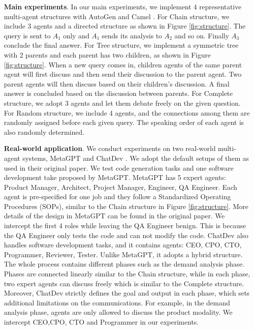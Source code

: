 \textbf{Main experiments}. In our main experiments, we implement 4 representative multi-agent structures with AutoGen \citep{wu2023autogen} and Camel \citep{li2023camel}. For Chain structure, we include 3 agents and a directed structure as shown in Figure \ref{fig:structure}. The query is sent to $A_1$ only and $A_1$ sends its analysis to $A_2$ and so on. Finally $A_3$ conclude the final answer. For Tree structure, we implement a symmetric tree with 2 parents and each parent has two children, as shown in Figure \ref{fig:structure}. When a new query comes in, children agents of the same parent agent will first discuss and then send their discussion to the parent agent. Two parent agents will then discuss based on their children's discussion. A final answer is concluded based on the discussion between parents. For Complete structure, we adopt 3 agents and let them debate freely on the given question. For Random structure, we include 4 agents, and the connections among them are randomly assigned before each given query. The speaking order of each agent is also randomly determined. 

\textbf{Real-world application}. We conduct experiments on two real-world multi-agent systems, MetaGPT \citep{hong2023metagpt} and ChatDev \citep{qian2024chatdev}. We adopt the default setups of them as used in their original paper. We test code generation tasks and one software development take proposed by MetaGPT. MetaGPT has 5 expert agents: Product Manager, Architect, Project Manager, Engineer, QA Engineer. Each agent is pre-specified for one job and they follow a Standardized Operating Procedures (SOPs), similar to the Chain structure in Figure \ref{fig:structure}. More details of the design in MetaGPT can be found in the original paper. We intercept the first 4 roles while leaving the QA Engineer benign. This is because the QA Engineer only tests the code and can not modify the code. ChatDev also handles software development tasks, and it contains agents: CEO, CPO, CTO, Programmer, Reviewer, Tester. Unlike MetaGPT, it adopts a hybrid structure. The whole process contains different phases such as the demand analysis phase. Phases are connected linearly similar to the Chain structure, while in each phase, two expert agents can discuss freely which is similar to the Complete structure. Moreover, ChatDev strictly defines the goal and output in each phase, which sets additional limitations on the communications. For example, in the demand analysis phase, agents are only allowed to discuss the product modality. We intercept CEO,CPO, CTO and Programmer in our experiments.


